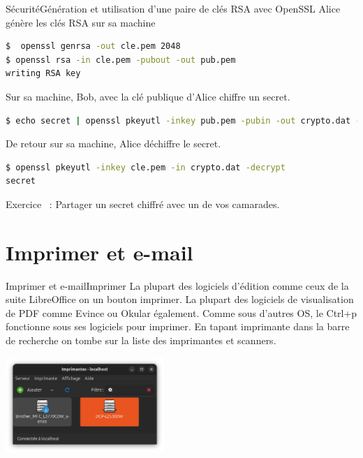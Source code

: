 \documentclass{beamer}
\begin{document}
    \begin{frame}[fragile]{Sécurité}{Génération et utilisation d'une paire de clés RSA avec OpenSSL}
        Alice génère les clés RSA sur sa machine
        \begin{lstlisting}[language=bash,basicstyle=\ttfamily\small]
$  openssl genrsa -out cle.pem 2048
$ openssl rsa -in cle.pem -pubout -out pub.pem
writing RSA key
        \end{lstlisting}
        Sur sa machine, Bob, avec la clé publique d'Alice chiffre un secret.
        \begin{lstlisting}[language=bash,basicstyle=\ttfamily\small]
$ echo secret | openssl pkeyutl -inkey pub.pem -pubin -out crypto.dat -encrypt
        \end{lstlisting}
        De retour sur sa machine, Alice déchiffre le secret.
        \begin{lstlisting}[language=bash,basicstyle=\ttfamily\small]
$ openssl pkeyutl -inkey cle.pem -in crypto.dat -decrypt
secret
        \end{lstlisting}
        Exercice \execcounterdispinc~:
        Partager un secret chiffré avec un de vos camarades.
    \end{frame}


    \section{Imprimer et e-mail}\label{sec:print-n-mail}

    \begin{frame}{Imprimer et e-mail}{Imprimer}
        La plupart des logiciels d'édition comme ceux de la suite LibreOffice on un bouton imprimer.
        La plupart des logiciels de visualisation de PDF comme Evince ou Okular également.
        \bigbreak
        Comme sous d'autres OS, le Ctrl+p fonctionne sous ses logiciels pour imprimer.
        \bigbreak
        En tapant imprimante dans la barre de recherche on tombe sur la liste des imprimantes et scanners.
        \begin{center}
            \includegraphics[width=6cm]{image/ubuntu-printers}
        \end{center}
    \end{frame}
\end{document}
